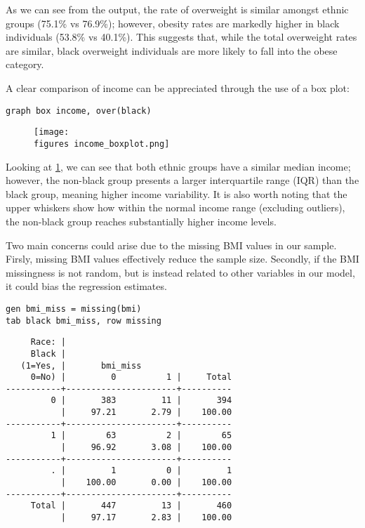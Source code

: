 As we can see from the output, the rate of overweight is similar amongst ethnic groups (75.1\% vs 76.9\%); however, obesity rates are markedly higher in black individuals (53.8\% vs 40.1\%). This suggests that, while the total overweight rates are similar, black overweight individuals are more likely to fall into the obese category.


A clear comparison of income can be appreciated through the use of a box plot:

\begin{verbatim}
graph box income, over(black)
\end{verbatim}

\begin{figure}[htbp]
\centering
\texttt{[image: \\figures income\_boxplot.png]}
\label{fig:income_boxplot}
\end{figure}

Looking at \ref{fig:income_boxplot}, we can see that both ethnic groups have a similar median income; however, the non-black group presents a larger interquartile range (IQR) than the black group, meaning higher income variability. It is also worth noting that the upper whiskers show how within the normal income range (excluding outliers), the non-black group reaches substantially higher income levels.


Two main concerns could arise due to the missing BMI values in our sample. Firsly, missing BMI values effectively reduce the sample size. Secondly, if the BMI missingness is not random, but is instead related to other variables in our model, it could bias the regression estimates.

\begin{verbatim}
gen bmi_miss = missing(bmi)
tab black bmi_miss, row missing
\end{verbatim}

\begin{verbatim}
     Race: |
     Black |
   (1=Yes, |       bmi_miss
     0=No) |         0          1 |     Total
-----------+----------------------+----------
         0 |       383         11 |       394 
           |     97.21       2.79 |    100.00 
-----------+----------------------+----------
         1 |        63          2 |        65 
           |     96.92       3.08 |    100.00 
-----------+----------------------+----------
         . |         1          0 |         1 
           |    100.00       0.00 |    100.00 
-----------+----------------------+----------
     Total |       447         13 |       460 
           |     97.17       2.83 |    100.00 
\end{verbatim}

